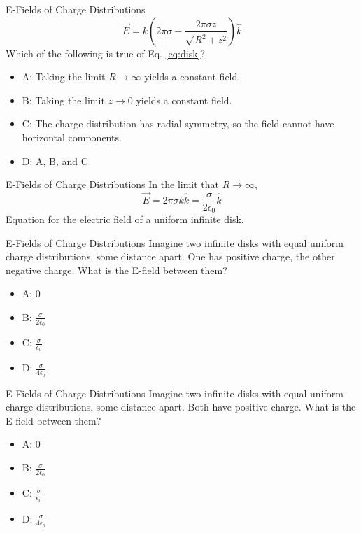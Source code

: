 \documentclass{beamer}
\begin{document}
\begin{frame}{E-Fields of Charge Distributions}
\begin{equation}
\boxed{
\vec{E} = k\left(2\pi\sigma - \frac{2\pi\sigma z}{\sqrt{R^2 + z^2}} \right)\hat{k}} \label{eq:disk}
\end{equation}
Which of the following is true of Eq. \ref{eq:disk}?
\begin{itemize}
\item A: Taking the limit $R \rightarrow \infty$ yields a constant field.
\item B: Taking the limit $z \rightarrow 0$ yields a constant field.
\item C: The charge distribution has radial symmetry, so the field cannot have horizontal components.
\item D: A, B, and C
\end{itemize}
\end{frame}

\begin{frame}{E-Fields of Charge Distributions}
In the limit that $R \rightarrow \infty$,
\begin{equation}
\vec{E} = 2\pi\sigma k \hat{k} = \frac{\sigma}{2\epsilon_0} \hat{k} \label{eq:disk3}
\end{equation}
Equation for the electric field of a uniform infinite disk.
\end{frame}

\begin{frame}{E-Fields of Charge Distributions}
Imagine two infinite disks with equal uniform charge distributions, some distance apart.  One has positive charge, the other negative charge.  What is the E-field between them?
\begin{itemize}
\item A: 0
\item B: $\frac{\sigma}{2\epsilon_0}$
\item C: $\frac{\sigma}{\epsilon_0}$
\item D: $\frac{\sigma}{4\epsilon_0}$
\end{itemize}
\end{frame}

\begin{frame}{E-Fields of Charge Distributions}
Imagine two infinite disks with equal uniform charge distributions, some distance apart.  Both have positive charge.  What is the E-field between them?
\begin{itemize}
\item A: 0
\item B: $\frac{\sigma}{2\epsilon_0}$
\item C: $\frac{\sigma}{\epsilon_0}$
\item D: $\frac{\sigma}{4\epsilon_0}$
\end{itemize}
\end{frame}
\end{document}

